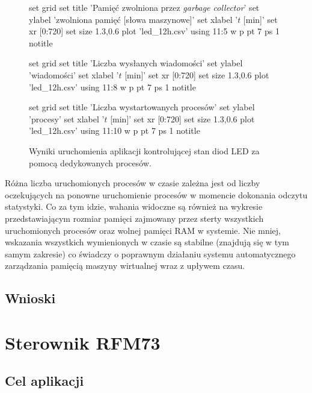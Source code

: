 \begin{figure}
\begin{gnuplot}[terminal=epslatex,terminaloptions=color]
	set grid
	set title 'Pamięć zwolniona przez \emph{garbage collector}'
	set ylabel 'zwolniona pamięć [słowa maszynowe]'
	set xlabel '$t$ [min]'
	set xr [0:720]
	set size 1.3,0.6
	plot 'led_12h.csv' using 11:5 w p pt 7 ps 1 notitle
\end{gnuplot}

\begin{gnuplot}[terminal=epslatex,terminaloptions=color]
	set grid
	set title 'Liczba wysłanych wiadomości'
	set ylabel 'wiadomości'
	set xlabel '$t$ [min]'
	set xr [0:720]
	set size 1.3,0.6
	plot 'led_12h.csv' using 11:8 w p pt 7 ps 1 notitle
\end{gnuplot}

\begin{gnuplot}[terminal=epslatex,terminaloptions=color]
	set grid
	set title 'Liczba wystartowanych procesów'
	set ylabel 'procesy'
	set xlabel '$t$ [min]'
	set xr [0:720]
	set size 1.3,0.6
	plot 'led_12h.csv' using 11:10 w p pt 7 ps 1 notitle
\end{gnuplot}

\caption{Wyniki uruchomienia aplikacji kontrolującej stan diod LED za pomocą dedykowanych procesów.}
\label{fig:ledGraphs}

\end{figure}

Różna liczba uruchomionych procesów w czasie zależna jest od liczby oczekujących na ponowne uruchomienie procesów w momencie dokonania odczytu statystyki.
Co za tym idzie, wahania widoczne są również na wykresie przedstawiającym rozmiar pamięci zajmowany przez sterty wszystkich uruchomionych procesów oraz wolnej pamięci RAM w systemie.
Nie mniej, wskazania wszystkich wymienionych w czasie są stabilne (znajdują się w tym samym zakresie) co świadczy o poprawnym działaniu systemu automatycznego zarządzania pamięcią maszyny wirtualnej wraz z upływem czasu.

\subsection{Wnioski}


\section{Sterownik RFM73}
\label{sec:przykladyRfm}

\subsection{Cel aplikacji}

